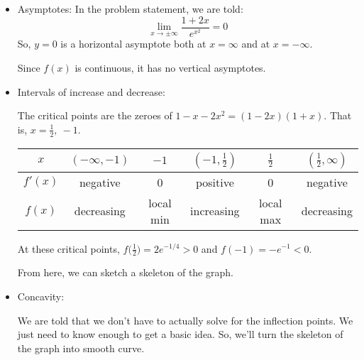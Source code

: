 \begin{solution}
\begin{itemize}
\item Asymptotes:
In the problem statement, we are told:
\[\lim_{x \to \pm \infty}\frac{1+2x}{e^{x^2}}=0\]
So, $y=0$ is a horizontal asymptote both at $x=\infty$ and at $x=-\infty$.

Since $f(x)$ is continuous, it has no vertical asymptotes.

\item Intervals of increase and decrease:

The critical points are the zeroes of $1-x-2x^2=(1-2x)(1+x)$. That is,
 $x=\frac{1}{2},\ -1$.

\begin{center}
\begin{tabular}{|c||c|c|c|c|c|}
\hline
$x$&$(-\infty,-1)$&$-1$&$(-1,\frac{1}{2})$&$\frac{1}{2}$&$(\frac{1}{2},\infty)$\\
\hline
$f'(x)$&negative&0&positive&0&negative\\
\hline
$f(x)$&decreasing&local min&increasing&local max&decreasing\\
\hline
\end{tabular}
\end{center}
At these critical points, $f\big(\frac{1}{2}\big)=2e^{-1/4}>0$ and $f(-1)=-e^{-1}<0$.

From here, we can sketch a skeleton of the graph.
\begin{center}
\end{center}

\item Concavity:

We are told that we don't have to actually solve for the inflection points. We just need to know enough to get a basic idea. So, we'll turn the skeleton of the graph into smooth curve.


\end{itemize}
\end{solution}
